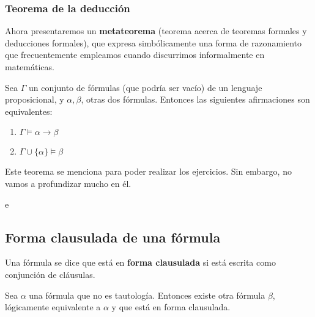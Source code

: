 \subsubsection{Teorema de la deducción}
Ahora presentaremos un \textbf{metateorema} (teorema acerca de teoremas formales y deducciones formales), que expresa simbólicamente una forma de razonamiento que frecuentemente empleamos cuando discurrimos informalmente en matemáticas.
\begin{nth}[de la Deducción]
    Sea $\Gamma$ un conjunto de fórmulas (que podría ser vacío) de un lenguaje proposicional, y $\alpha,\beta$, otras dos fórmulas. Entonces las siguientes afirmaciones son equivalentes:
    \begin{enumerate}
        \item $\Gamma \models \alpha \to \beta$
        \item $\Gamma \cup \{\alpha\} \models \beta$
    \end{enumerate}
\end{nth}
\begin{nota}
    Este teorema se menciona para poder realizar los ejercicios. Sin embargo, no vamos a profundizar mucho en él.
\end{nota}

\begin{ejemplo}
    e
\end{ejemplo}

\subsection{Forma clausulada de una fórmula}
\begin{ndef}
    Una fórmula se dice que está en \textbf{forma clausulada} si está escrita como conjunción de cláusulas.
\end{ndef}

\begin{nth}
    Sea $\alpha$ una fórmula que no es tautología. Entonces existe otra fórmula $\beta$, lógicamente equivalente a $\alpha$ y que está en forma clausulada.
\end{nth}
